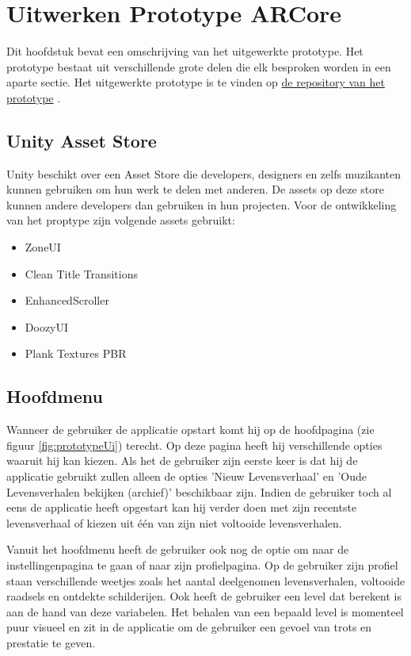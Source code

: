 \chapter{Uitwerken Prototype ARCore}
\label{ch:prototype}

Dit hoofdstuk bevat een omschrijving van het uitgewerkte prototype. Het prototype bestaat uit verschillende grote delen die elk besproken worden in een aparte sectie. Het uitgewerkte prototype is te vinden op \href{https://github.com/MatthiasDeFre/Bachelorproef-Prototype}{de repository van het prototype} \autocite{GITHUBPROTOTY}.

\section{Unity Asset Store}
Unity beschikt over een Asset Store die developers, designers en zelfs muzikanten kunnen gebruiken om hun werk te delen met anderen. De assets op deze store kunnen andere developers dan gebruiken in hun projecten. Voor de ontwikkeling van het proptype zijn volgende assets gebruikt:

\begin{itemize}
    \item ZoneUI \autocite{MichskyZone}
    \item Clean Title Transitions \autocite{MichskyTitle}
    \item EnhancedScroller \autocite{EchoScroller}
    \item DoozyUI \autocite{DoozyUI}
    \item Plank Textures PBR \autocite{UnityWood}
\end{itemize}

\section{Hoofdmenu}
Wanneer de gebruiker de applicatie opstart komt hij op de hoofdpagina (zie figuur \ref{fig:prototypeUi}) terecht. Op deze pagina heeft hij verschillende opties waaruit hij kan kiezen. Als het de gebruiker zijn eerste keer is dat hij de applicatie gebruikt zullen alleen de opties 'Nieuw Levensverhaal' en 'Oude Levensverhalen bekijken (archief)' beschikbaar zijn. Indien de gebruiker toch al eens de applicatie heeft opgestart kan hij verder doen met zijn recentste levensverhaal of kiezen uit één van zijn niet voltooide levensverhalen. 

Vanuit het hoofdmenu heeft de gebruiker ook nog de optie om naar de instellingenpagina te gaan of naar zijn profielpagina. Op de gebruiker zijn profiel staan verschillende weetjes zoals het aantal deelgenomen levensverhalen, voltooide raadsels en ontdekte schilderijen. Ook heeft de gebruiker een level dat berekent is aan de hand van deze variabelen. Het behalen van een bepaald level is momenteel puur visueel en zit in de applicatie om de gebruiker een gevoel van trots en prestatie te geven.

